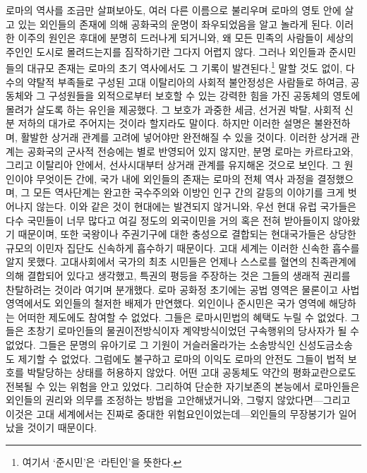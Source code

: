로마의 역사를 조금만 살펴보아도,
여러 다른 이름으로 불리우며
로마의 영토 안에
살고 있는 외인들의 존재에 의해 공화국의 운명이
좌우되었음을 알고 놀라게 된다.
이러한 이주의 원인은 후대에 분명히 드러나게 되거니와,
왜 모든 민족의 사람들이 세상의 주인인 도시로 몰려드는지를
짐작하기란 그다지 어렵지 않다.
그러나 외인들과 준시민들의 대규모 존재는
로마의 초기 역사에서도 그 기록이 발견된다.\footnote{여기서 `준시민'은
`라틴인'을 뜻한다.}
말할 것도 없이,
다수의 약탈적 부족들로 구성된 고대 이탈리아의 사회적 불안정성은
사람들로 하여금, 공동체와 그 구성원들을 외적으로부터 보호할 수 있는
강력한 힘을 가진 공동체의 영토에 몰려가 살도록 하는 유인을 제공했다.
그 보호가 과중한 세금, 선거권 박탈, 사회적 신분 저하의 대가로
주어지는 것이라 할지라도 말이다.
하지만 이러한 설명은 불완전하며,
활발한 상거래 관계를 고려에 넣어야만 완전해질 수 있을 것이다.
이러한 상거래 관계는 공화국의 군사적 전승에는
별로 반영되어 있지 않지만,
분명 로마는 카르타고와, 그리고 이탈리아 안에서,
선사시대부터 상거래 관계를 유지해온 것으로 보인다.
그 원인이야 무엇이든 간에,
국가 내에 외인들의 존재는
로마의 전체 역사 과정을 결정했으며,
그 모든 역사단계는 완고한 국수주의와 이방인 인구 간의 갈등의 이야기를
크게 벗어나지 않는다.
이와 같은 것이 현대에는 발견되지 않거니와,
우선 현대 유럽 국가들은 다수 국민들이 너무 많다고 여길 정도의
외국이민을 거의 혹은 전혀 받아들이지 않아왔기 때문이며,
또한
국왕이나 주권기구에 대한 충성으로 결합되는 현대국가들은
상당한 규모의 이민자 집단도
신속하게 흡수하기 때문이다.
고대 세계는 이러한 신속한 흡수를 알지 못했다.
고대사회에서 국가의 최초 시민들은 언제나 스스로를 혈연의 친족관계에 의해
결합되어 있다고 생각했고,
특권의 평등을 주장하는 것은 그들의 생래적 권리를 찬탈하려는 것이라
여기며 분개했다.
로마 공화정 초기에는
공법 영역은 물론이고 사법 영역에서도
외인들의 철저한 배제가 만연했다.
외인이나 준시민은
국가 영역에 해당하는 어떠한 제도에도 참여할 수 없었다.
그들은 로마시민법의 혜택도 누릴 수 없었다.
그들은 초창기 로마인들의 물권이전방식이자 계약방식이었던
구속행위의 당사자가 될 수 없었다.
그들은 문명의 유아기로 그 기원이 거슬러올라가는 소송방식인
신성도금소송도 제기할 수 없었다.
그럼에도 불구하고 로마의 이익도 로마의 안전도 그들이 법적 보호를 박탈당하는
상태를 허용하지 않았다.
어떤 고대 공동체도 약간의 평화교란으로도 전복될 수 있는 위험을 안고 있었다.
그리하여 단순한 자기보존의 본능에서 로마인들은
외인들의 권리와 의무를 조정하는 방법을 고안해냈거니와,
그렇지 않았다면---그리고 이것은 고대 세계에서는
진짜로 중대한 위험요인이었는데---외인들의 무장봉기가 일어났을 것이기 때문이다.
